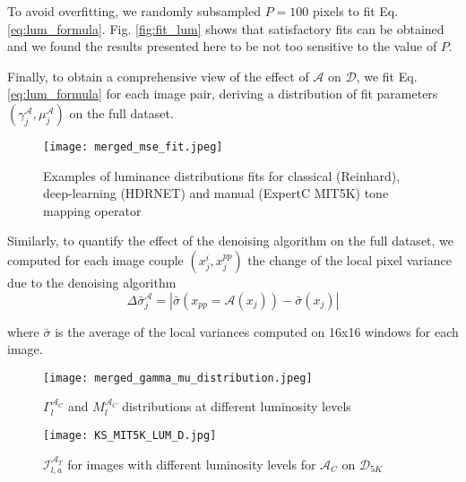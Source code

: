 \documentclass[12pt]{spieman}  %
\begin{document}
\begin{spacing}{2}
\begin{linenumbers}
To avoid overfitting, we randomly subsampled $P=100$ pixels to fit Eq.\ref{eq:lum_formula}. Fig. \ref{fig:fit_lum} shows that satisfactory fits can be obtained and we found the results presented here to be not too sensitive to the value of $P$.


Finally, to obtain a comprehensive view of the effect of $\mathcal{A}$ on $\mathcal{D}$, we fit Eq.\ref{eq:lum_formula} for each image pair, deriving a distribution of fit parameters $\left ( \gamma_j^{\mathcal{A}}, \mu_j^{\mathcal{A}} \right )$ on the full dataset.




\begin{figure*}[!t]
	\centering
	\texttt{[image: merged\_mse\_fit.jpeg]}
	\caption{Examples of luminance distributions fits for classical (Reinhard), deep-learning (HDRNET) and manual (ExpertC MIT5K) tone mapping operator}\label{fig:fit_lum}  
	\label{fig:lum_group_hue_distribution}
\end{figure*}



Similarly, to quantify the effect of the denoising algorithm on the full dataset,  we computed for each image couple $\left (  x_j^i, x_j^{pp}  \right )$ the change of the local pixel variance due to the denoising algorithm
\begin{equation}
	\Delta \bar{\sigma}_j^{\mathcal{A}} =  \left|  \bar{\sigma} \left ( x_{pp}= \mathcal{A}(x_j) \right ) - \bar{\sigma}\left ( x_j \right ) \right|
\label{eq:delta_var}
\end{equation}


where $\bar{\sigma}$  is the average of the local variances computed on 16x16 windows for each image.




\begin{figure*}[!t]
	\centering
	\texttt{[image: merged\_gamma\_mu\_distribution.jpeg]}
	\caption{$\Gamma^{\mathcal{A}_{C}}_l$ and $M^{\mathcal{A}_{C}}_l$ distributions at different luminosity levels}   
	\label{fig:gamma_mu_distr_defin}  
\end{figure*}



\begin{figure*}[!t]
	\centering
	\texttt{[image: KS\_MIT5K\_LUM\_D.jpg]}
	\caption{$\mathcal{I}_{l,a}^{\mathcal{A}_T}$  for images with different luminosity levels for $\mathcal{A}_C$ on $\mathcal{D}_{5K}$ }   
	\label{fig:ds_luminosity}
\end{figure*}



\end{linenumbers}
\end{spacing}
\end{document}
